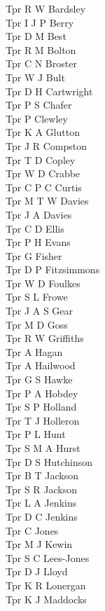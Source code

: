 \begin{multicols}{3}
  Tpr R W Bardsley \\
  Tpr I J P Berry \\
  Tpr D M Best \\
  Tpr R M Bolton \\
  Tpr C N Broster \\
  Tpr W J Bult \\
  Tpr D H Cartwright \\
  Tpr P S Chafer \\
  Tpr P Clewley \\
  Tpr K A Glutton \\
  Tpr J R Compston \\
  Tpr T D Copley \\
  Tpr W D Crabbe \\
  Tpr C P C Curtis \\
  Tpr M T W Davies \\
  Tpr J A Davies \\
  Tpr C D Ellis \\
  Tpr P H Evans \\
  Tpr G Fisher \\
  Tpr D P Fitzsimmons \\
  Tpr W D Foulkes \\
  Tpr S L Frowe \\
  Tpr J A S Gear \\
  Tpr M D Goss \\
  Tpr R W Griffiths \\
  Tpr A Hagan \\
  Tpr A Hailwood \\
  Tpr G S Hawke \\
  Tpr P A Hobdey \\
  Tpr S P Holland \\
  Tpr T J Holleron \\
  Tpr P L Hunt \\
  Tpr S M A Hurst \\
  Tpr D S Hutchinson \\
  Tpr B T Jackson \\
  Tpr S R Jackson \\
  Tpr L A Jenkins \\
  Tpr D C Jenkins \\
  Tpr C Jones \\
  Tpr M J Kewin \\
  Tpr S C Lees-Jones \\
  Tpr D J Lloyd \\
  Tpr K R Lonergan \\
  Tpr K J Maddocks \\

\end{multicols}
